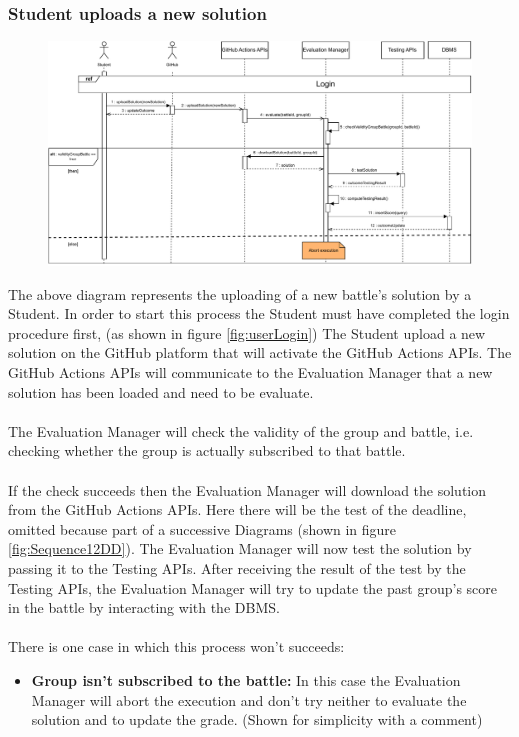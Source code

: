 \documentclass{article}
\begin{document}
{    \subsubsection{Student uploads a new solution}
        \begin{figure}[H]
            \centering
            \hspace*{-3cm}\includegraphics[scale=0.62]{Sequence/Sequence11DD.pdf}
            \caption{}
            \label{fig:Sequence11DD}
        \end{figure}


        The above diagram represents the uploading of a new battle's solution by a Student.
        In order to start this process the Student must have 
        completed the login procedure first, (as shown in figure \ref{fig:userLogin})
        The Student upload a new solution on the GitHub platform that will activate the GitHub
        Actions APIs. The GitHub Actions APIs will communicate to the Evaluation Manager
        that a new solution has been loaded and need to be evaluate.
        \\ \\
        The Evaluation Manager will check the validity of the group and battle,
        i.e. checking whether the group is actually subscribed to that battle.
        \\ \\
        If the check succeeds then the Evaluation Manager will download the
        solution from the GitHub Actions APIs.
        Here there will be the test of the deadline, omitted because part
        of a successive Diagrams (shown in figure \ref{fig:Sequence12DD}).
        The Evaluation Manager will now test the solution by passing it to the Testing APIs.
        After receiving the result of the test by the Testing APIs, the Evaluation Manager will
        try to update the past group's score in the battle by interacting with the DBMS.
        \\ \\
        There is one case in which this process won’t succeeds:        
        \begin{itemize}
            \item \textbf{Group isn't subscribed to the battle:} In this case the Evaluation Manager 
            will abort the execution and don't try neither to evaluate the solution and 
            to update the grade. (Shown for simplicity with a comment)
          \end{itemize}

}
\end{document}
